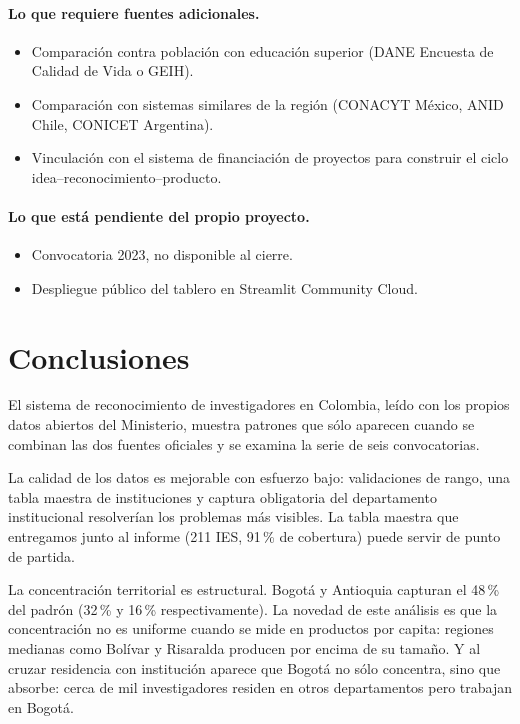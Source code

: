 \documentclass[11pt,a4paper,oneside]{article}
\begin{document}
\paragraph{Lo que requiere fuentes adicionales.}
\begin{itemize}
\item Comparación contra población con educación superior (DANE Encuesta de Calidad de Vida o GEIH).
\item Comparación con sistemas similares de la región (CONACYT México, ANID Chile, CONICET Argentina).
\item Vinculación con el sistema de financiación de proyectos para construir el ciclo idea--reconocimiento--producto.
\end{itemize}

\paragraph{Lo que está pendiente del propio proyecto.}
\begin{itemize}
\item Convocatoria 2023, no disponible al cierre.
\item Despliegue público del tablero en Streamlit Community Cloud.
\end{itemize}

\section{Conclusiones}\label{sec:conclusiones}

El sistema de reconocimiento de investigadores en Colombia, leído con los propios datos abiertos del Ministerio, muestra patrones que sólo aparecen cuando se combinan las dos fuentes oficiales y se examina la serie de seis convocatorias.

La calidad de los datos es mejorable con esfuerzo bajo: validaciones de rango, una tabla maestra de instituciones y captura obligatoria del departamento institucional resolverían los problemas más visibles. La tabla maestra que entregamos junto al informe (211 IES, 91\,\% de cobertura) puede servir de punto de partida.

La concentración territorial es estructural. Bogotá y Antioquia capturan el 48\,\% del padrón (32\,\% y 16\,\% respectivamente). La novedad de este análisis es que la concentración no es uniforme cuando se mide en productos por capita: regiones medianas como Bolívar y Risaralda producen por encima de su tamaño. Y al cruzar residencia con institución aparece que Bogotá no sólo concentra, sino que absorbe: cerca de mil investigadores residen en otros departamentos pero trabajan en Bogotá.
\end{document}
